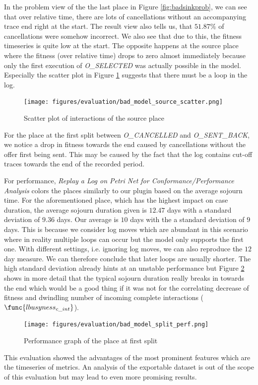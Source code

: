 In the problem view of the the last place in Figure \ref{fig:badsinkprob}, we can see that over relative time, there are lots of cancellations without an accompanying trace end right at the start. The result view also tells us, that $51.87\%$ of cancellations were somehow incorrect. We also see that due to this, the fitness timeseries is quite low at the start.
The opposite happens at the source place where the fitness (over relative time) drops to zero almost immediately because only the first execution of \emph{O\_SELECTED} was actually possible in the model. Especially the scatter plot in Figure \ref{fig:badsourcescatter} suggests that there must be a loop in the log.
\begin{figure}[H]
    \centering
    \texttt{[image: figures/evaluation/bad\_model\_source\_scatter.png]}
    \caption{Scatter plot of interactions of the source place}
    \label{fig:badsourcescatter}
\end{figure}

For the place at the first split between \emph{O\_CANCELLED} and \emph{O\_SENT\_BACK}, we notice a drop in fitness towards the end caused by cancellations without the offer first being sent. This may be caused by the fact that the log contains cut-off traces towards the end of the recorded period.

For performance, \emph{Replay a Log on Petri Net for Conformance/Performance Analysis} colors the places similarly to our plugin based on the average sojourn time. For the aforementioned place, which has the highest impact on case duration, the average sojourn duration given is $12.47$ days with a standard deviation of $9.36$ days. Our average is $10$ days with the a standard deviation of $9$ days. This is because we consider log moves which are abundant in this scenario where in reality multiple loops can occur but the model only supports the first one. With different settings, i.e. ignoring log moves, we can also reproduce the $12$ day measure. We can therefore conclude that later loops are usually shorter. The high standard deviation already hints at an unstable performance but Figure \ref{fig:badsplitperf} shows in more detail that the typical sojourn duration really breaks in towards the end which would be a good thing if it was not for the correlating decrease of fitness and dwindling number of incoming complete interactions ($\func{lbusyness_{c\_int}}$).
\begin{figure}
    \centering
    \texttt{[image: figures/evaluation/bad\_model\_split\_perf.png]}
    \caption{Performance graph of the place at first split}
    \label{fig:badsplitperf}
\end{figure}

This evaluation showed the advantages of the most prominent features which are the timeseries of metrics. An analysis of the exportable dataset is out of the scope of this evaluation but may lead to even more promising results.